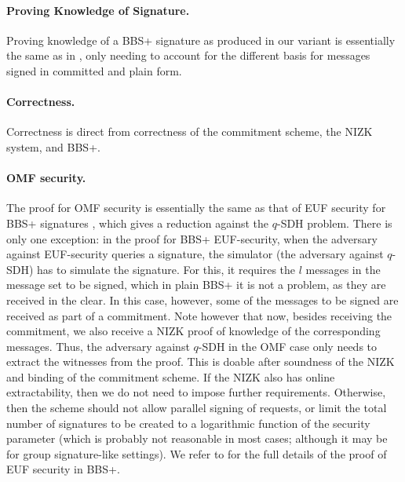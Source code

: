 \paragraph{Proving Knowledge of Signature.} %
Proving knowledge of a BBS+ signature as produced in our \SBCM variant
is essentially the same as in \cite{asm06,cdl16b}, only needing to account for
the different basis for messages signed in committed and plain form.

\paragraph{Correctness.} Correctness is direct from correctness of the
commitment scheme, the NIZK system, and BBS+.

\paragraph{OMF security.} The proof for OMF security is essentially the
same as that of EUF security for BBS+ signatures \cite{cdl16b}, which gives a
reduction against the $q$-SDH problem. There is only one exception: in the proof
for BBS+ EUF-security, when the adversary against EUF-security queries a
signature, the simulator (the adversary against $q$-SDH) has to simulate the
signature. For this, it requires the $l$ messages in the message set to be
signed, which in plain BBS+ it is not a problem, as they are received in the
clear. In this case, however, some of the messages to be signed are
received as part of a commitment. Note however that now, besides receiving
the commitment, we also receive a NIZK proof of knowledge of the corresponding
messages. Thus, the adversary against $q$-SDH in the OMF case only needs to
extract the witnesses from the proof. This is doable after soundness of the NIZK
and binding of the commitment scheme. %
If the NIZK also has online extractability, then we do not need to impose
further requirements. Otherwise, then the scheme should not allow
parallel signing of requests, or limit the total number of signatures to be
created to a logarithmic function of the security parameter (which is probably
not reasonable in most cases; although it may be for group signature-like
settings). We refer to \cite[Lemma 1]{cdl16b} for the full details of the proof
of EUF security in BBS+.
%

